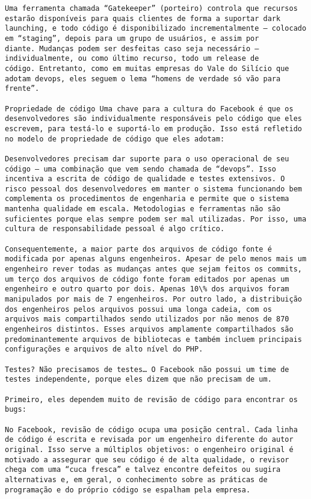 \begin{verbatim}
Uma ferramenta chamada “Gatekeeper” (porteiro) controla que recursos
estarão disponíveis para quais clientes de forma a suportar dark
launching, e todo código é disponibilizado incrementalmente – colocado
em “staging”, depois para um grupo de usuários, e assim por
diante. Mudanças podem ser desfeitas caso seja necessário –
individualmente, ou como último recurso, todo um release de
código. Entretanto, como em muitas empresas do Vale do Silício que
adotam devops, eles seguem o lema “homens de verdade só vão para
frente”.

Propriedade de código Uma chave para a cultura do Facebook é que os
desenvolvedores são individualmente responsáveis pelo código que eles
escrevem, para testá-lo e suportá-lo em produção. Isso está refletido
no modelo de propriedade de código que eles adotam:

Desenvolvedores precisam dar suporte para o uso operacional de seu
código – uma combinação que vem sendo chamada de “devops”. Isso
incentiva a escrita de código de qualidade e testes extensivos. O
risco pessoal dos desenvolvedores em manter o sistema funcionando bem
complementa os procedimentos de engenharia e permite que o sistema
mantenha qualidade em escala. Metodologias e ferramentas não são
suficientes porque elas sempre podem ser mal utilizadas. Por isso, uma
cultura de responsabilidade pessoal é algo crítico.

Consequentemente, a maior parte dos arquivos de código fonte é
modificada por apenas alguns engenheiros. Apesar de pelo menos mais um
engenheiro rever todas as mudanças antes que sejam feitos os commits,
um terço dos arquivos de código fonte foram editados por apenas um
engenheiro e outro quarto por dois. Apenas 10\% dos arquivos foram
manipulados por mais de 7 engenheiros. Por outro lado, a distribuição
dos engenheiros pelos arquivos possui uma longa cadeia, com os
arquivos mais compartilhados sendo utilizados por não menos de 870
engenheiros distintos. Esses arquivos amplamente compartilhados são
predominantemente arquivos de bibliotecas e também incluem principais
configurações e arquivos de alto nível do PHP.

Testes? Não precisamos de testes… O Facebook não possui um time de
testes independente, porque eles dizem que não precisam de um.

Primeiro, eles dependem muito de revisão de código para encontrar os bugs:

No Facebook, revisão de código ocupa uma posição central. Cada linha
de código é escrita e revisada por um engenheiro diferente do autor
original. Isso serve a múltiplos objetivos: o engenheiro original é
motivado a assegurar que seu código é de alta qualidade, o revisor
chega com uma “cuca fresca” e talvez encontre defeitos ou sugira
alternativas e, em geral, o conhecimento sobre as práticas de
programação e do próprio código se espalham pela empresa.


\end{verbatim}
